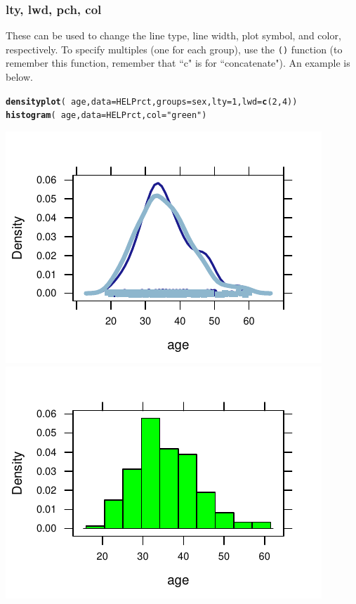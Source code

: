 \documentclass[twoside]{book}\usepackage[]{graphicx}\usepackage[]{xcolor}
\makeatletter
\def\maxwidth{ %
  \ifdim\Gin@nat@width>\linewidth
    \linewidth
  \else
    \Gin@nat@width
  \fi
}
\newcommand{\hlnum}[1]{\textcolor[rgb]{0.686,0.059,0.569}{#1}}%
\newcommand{\hlstr}[1]{\textcolor[rgb]{0.192,0.494,0.8}{#1}}%
\newcommand{\hlopt}[1]{\textcolor[rgb]{0,0,0}{#1}}%
\newcommand{\hlstd}[1]{\textcolor[rgb]{0.345,0.345,0.345}{#1}}%
\newcommand{\hlkwc}[1]{\textcolor[rgb]{0.333,0.667,0.333}{#1}}%
\newcommand{\hlkwd}[1]{\textcolor[rgb]{0.737,0.353,0.396}{\textbf{#1}}}%
\newenvironment{kframe}{%
 \def\at@end@of@kframe{}%
 \ifinner\ifhmode%
  \def\at@end@of@kframe{\end{minipage}}%
  \begin{minipage}{\columnwidth}%
 \fi\fi%
 \def\FrameCommand##1{\hskip\@totalleftmargin \hskip-\fboxsep
 \colorbox{shadecolor}{##1}\hskip-\fboxsep
     \hskip-\linewidth \hskip-\@totalleftmargin \hskip\columnwidth}%
 \MakeFramed {\advance\hsize-\width
   \@totalleftmargin\z@ \linewidth\hsize
   \@setminipage}}%
 {\par\unskip\endMakeFramed%
 \at@end@of@kframe}
\newenvironment{knitrout}{}{} %
\newcommand{\Rindex}[1]{\index{\texttt{#1}}}
\newcommand{\function}[1]{{\color{purple!75!blue}\texttt{\StrSubstitute{#1}{()}{}()}}\Rindex{#1}}
\newcounter{example}[section]
\makeatother
\begin{document}
\subsubsection*{lty, lwd, pch, col}
These can be used to change the line type, line width, plot symbol, and
color, respectively.  To specify multiples (one for each group), use the \function{c()} function
(to remember this function, remember that ``c" is for ``concatenate").  An example is below.


\begin{knitrout}
\color{fgcolor}\begin{kframe}
\begin{alltt}
\hlkwd{densityplot}\hlstd{(}\hlopt{~}\hlstd{age,} \hlkwc{data} \hlstd{= HELPrct,} \hlkwc{groups} \hlstd{= sex,} \hlkwc{lty} \hlstd{=} \hlnum{1}\hlstd{,} \hlkwc{lwd} \hlstd{=} \hlkwd{c}\hlstd{(}\hlnum{2}\hlstd{,} \hlnum{4}\hlstd{))}
\hlkwd{histogram}\hlstd{(}\hlopt{~}\hlstd{age,} \hlkwc{data} \hlstd{= HELPrct,} \hlkwc{col} \hlstd{=} \hlstr{"green"}\hlstd{)}
\end{alltt}
\end{kframe}

{\centering \includegraphics[width=\maxwidth]{figures/fig-pch-lwd-lty-1} 
\includegraphics[width=\maxwidth]{figures/fig-pch-lwd-lty-2} 

}



\end{knitrout}
\end{document}

